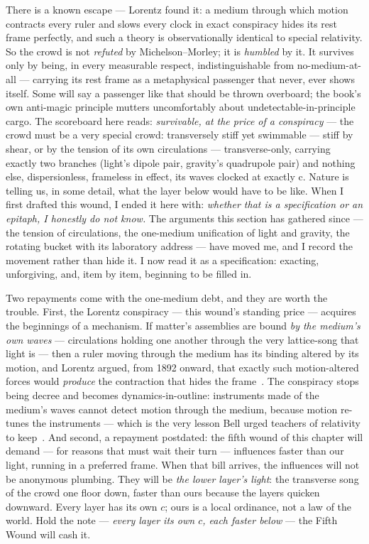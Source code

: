 \documentclass[fontsize=11pt,paper=a4,pagesize=auto,parskip=half-]{scrbook}
\newcommand{\Ixtmp}{}
\DeclareRobustCommand{\Ix}[1]{%
  #1%
  \begingroup
    \lowercase{\gdef\Ixtmp{#1}}%
    \expandafter\index\expandafter{\Ixtmp}%
  \endgroup}
\newcommand{\Iy}[1]{#1\index{#1}}
\begin{document}
There is a known escape --- \Iy{Lorentz} found it: a medium through which motion contracts every ruler and slows every clock in exact conspiracy hides its rest frame perfectly, and such a theory is observationally identical to special relativity. So the crowd is not \emph{refuted} by Michelson--Morley; it is \emph{humbled} by it. It survives only by being, in every measurable respect, indistinguishable from no-medium-at-all --- carrying its rest frame as a metaphysical passenger that never, ever shows itself. Some will say a passenger like that should be thrown overboard; the book's own anti-magic principle mutters uncomfortably about undetectable-in-principle cargo. The scoreboard here reads: \emph{survivable, at the price of a conspiracy} --- the crowd must be a very special crowd: transversely stiff yet swimmable --- stiff by shear, or by the tension of its own circulations --- transverse-only, carrying exactly two branches (light's dipole pair, gravity's quadrupole pair) and nothing else, dispersionless, frameless in effect, its waves clocked at exactly c. Nature is telling us, in some detail, what the layer below would have to be like. When I first drafted this wound, I ended it here with: \emph{whether that is a specification or an epitaph, I honestly do not know.} The arguments this section has gathered since --- the tension of circulations, the one-medium unification of light and gravity, the rotating bucket with its laboratory address --- have moved me, and I record the movement rather than hide it. I now read it as a specification: exacting, unforgiving, and, item by item, beginning to be filled in.

Two repayments come with the one-medium debt, and they are worth the trouble. First, the Lorentz conspiracy --- this wound's standing price --- acquires the beginnings of a mechanism. If matter's assemblies are bound \emph{by the medium's own waves} --- circulations holding one another through the very lattice-song that light is --- then a ruler moving through the medium has its binding altered by its motion, and Lorentz argued, from 1892 onward, that exactly such motion-altered forces would \emph{produce} the \Ix{contraction} that hides the frame~\cite{lorentz1904}. The conspiracy stops being decree and becomes dynamics-in-outline: instruments made of the medium's waves cannot detect motion through the medium, because motion re-tunes the instruments --- which is the very lesson \Iy{Bell} urged teachers of relativity to keep~\cite[67--80]{bell1987}. And second, a repayment postdated: the fifth wound of this chapter will demand --- for reasons that must wait their turn --- influences faster than our light, running in a preferred frame. When that bill arrives, the influences will not be anonymous plumbing. They will be \emph{the lower layer's light}: the transverse song of the crowd one floor down, faster than ours because the layers quicken downward. Every layer has its own $c$; ours is a local ordinance, not a law of the world. Hold the note --- \emph{every layer its own $c$, each faster below} --- the Fifth Wound will cash it.
\end{document}
